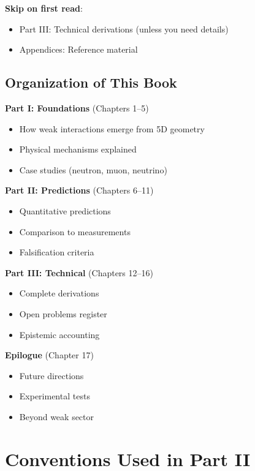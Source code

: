 \textbf{Skip on first read}:
\begin{itemize}
\item Part III: Technical derivations (unless you need details)
\item Appendices: Reference material
\end{itemize}

\subsection{Organization of This Book}

\textbf{Part I: Foundations} (Chapters 1--5)
\begin{itemize}
\item How weak interactions emerge from 5D geometry
\item Physical mechanisms explained
\item Case studies (neutron, muon, neutrino)
\end{itemize}

\textbf{Part II: Predictions} (Chapters 6--11)
\begin{itemize}
\item Quantitative predictions
\item Comparison to measurements
\item Falsification criteria
\end{itemize}

\textbf{Part III: Technical} (Chapters 12--16)
\begin{itemize}
\item Complete derivations
\item Open problems register
\item Epistemic accounting
\end{itemize}

\textbf{Epilogue} (Chapter 17)
\begin{itemize}
\item Future directions
\item Experimental tests
\item Beyond weak sector
\end{itemize}

\section{Conventions Used in Part II}
\label{sec:bridge_conventions}

